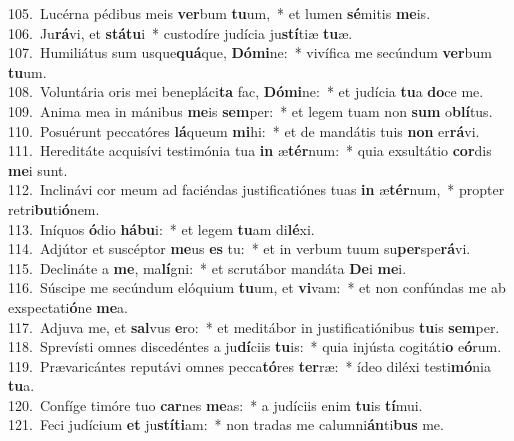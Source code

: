 {105.~}Lucérna pédibus meis \textbf{ver}bum \textbf{tu}um,~* et lumen \textbf{sé}mitis \textbf{me}is.\\
{106.~}Ju\textbf{rá}vi, et \textbf{stá}\textbf{tu}i~* custodíre judícia ju\textbf{stí}tiæ \textbf{tu}æ.\\
{107.~}Humiliátus sum usque\textbf{quá}que, \textbf{Dó}\textbf{mi}ne:~* vivífica me secúndum \textbf{ver}bum \textbf{tu}um.\\
{108.~}Voluntária oris mei benepláci\textbf{ta} fac, \textbf{Dó}\textbf{mi}ne:~* et judícia \textbf{tu}a \textbf{do}ce me.\\
{109.~}Anima mea in mánibus \textbf{me}is \textbf{sem}per:~* et legem tuam non \textbf{sum} o\textbf{blí}tus.\\
{110.~}Posuérunt peccatóres \textbf{lá}queum \textbf{mi}hi:~* et de mandátis tuis \textbf{non} er\textbf{rá}vi.\\
{111.~}Hereditáte acquisívi testimónia tua \textbf{in} æ\textbf{tér}num:~* quia exsultátio \textbf{cor}dis \textbf{me}i sunt.\\
{112.~}Inclinávi cor meum ad faciéndas justificatiónes tuas \textbf{in} æ\textbf{tér}num,~* propter retri\textbf{bu}ti\textbf{ó}nem.\\
{113.~}Iníquos \textbf{ó}dio \textbf{há}\textbf{bu}i:~* et legem \textbf{tu}am di\textbf{lé}xi.\\
{114.~}Adjútor et suscéptor \textbf{me}us \textbf{es} tu:~* et in verbum tuum su\textbf{per}spe\textbf{rá}vi.\\
{115.~}Declináte a \textbf{me}, ma\textbf{lí}gni:~* et scrutábor mandáta \textbf{De}i \textbf{me}i.\\
{116.~}Súscipe me secúndum elóquium \textbf{tu}um, et \textbf{vi}vam:~* et non confúndas me ab exspectati\textbf{ó}ne \textbf{me}a.\\
{117.~}Adjuva me, et \textbf{sal}vus \textbf{e}ro:~* et meditábor in justificatiónibus \textbf{tu}is \textbf{sem}per.\\
{118.~}Sprevísti omnes discedéntes a ju\textbf{dí}ciis \textbf{tu}is:~* quia injústa cogitáti\textbf{o} e\textbf{ó}rum.\\
{119.~}Prævaricántes reputávi omnes pecca\textbf{tó}res \textbf{ter}ræ:~* ídeo diléxi testi\textbf{mó}nia \textbf{tu}a.\\
{120.~}Confíge timóre tuo \textbf{car}nes \textbf{me}as:~* a judíciis enim \textbf{tu}is \textbf{tí}mui.\\
{121.~}Feci judícium \textbf{et} ju\textbf{stí}\textbf{ti}am:~* non tradas me calumni\textbf{án}ti\textbf{bus} me.\\
